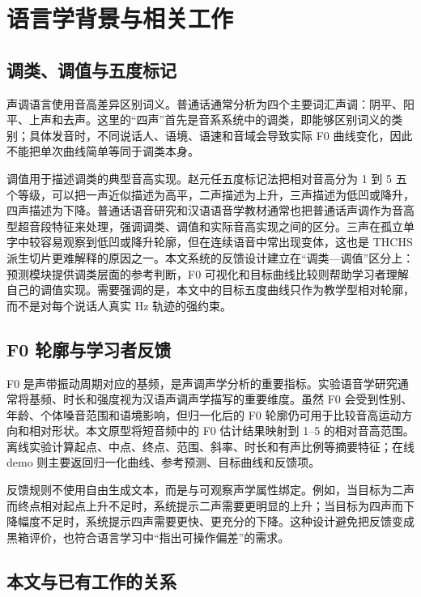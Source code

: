 \documentclass[UTF8,a4paper,twocolumn]{ctexart}
\begin{document}
\section{语言学背景与相关工作}

\subsection{调类、调值与五度标记}

声调语言使用音高差异区别词义。普通话通常分析为四个主要词汇声调：阴平、阳平、上声和去声。这里的“四声”首先是音系系统中的调类，即能够区别词义的类别；具体发音时，不同说话人、语境、语速和音域会导致实际 F0 曲线变化，因此不能把单次曲线简单等同于调类本身。

调值用于描述调类的典型音高实现。赵元任五度标记法把相对音高分为 1 到 5 五个等级，可以把一声近似描述为高平，二声描述为上升，三声描述为低凹或降升，四声描述为下降\cite{chao1930}。普通话语音研究和汉语语音学教材通常也把普通话声调作为音高型超音段特征来处理，强调调类、调值和实际音高实现之间的区分\cite{wu1992,zhu2010,huangliao2017,linwang2013}。三声在孤立单字中较容易观察到低凹或降升轮廓，但在连续语音中常出现变体，这也是 THCHS 派生切片更难解释的原因之一。本文系统的反馈设计建立在“调类—调值”区分上：预测模块提供调类层面的参考判断，F0 可视化和目标曲线比较则帮助学习者理解自己的调值实现。需要强调的是，本文中的目标五度曲线只作为教学型相对轮廓，而不是对每个说话人真实 Hz 轨迹的强约束。

\subsection{F0 轮廓与学习者反馈}

F0 是声带振动周期对应的基频，是声调声学分析的重要指标。实验语音学研究通常将基频、时长和强度视为汉语声调声学描写的重要维度\cite{shilin1986}。虽然 F0 会受到性别、年龄、个体嗓音范围和语境影响，但归一化后的 F0 轮廓仍可用于比较音高运动方向和相对形状。本文原型将短音频中的 F0 估计结果映射到 1--5 的相对音高范围。离线实验计算起点、中点、终点、范围、斜率、时长和有声比例等摘要特征；在线 demo 则主要返回归一化曲线、参考预测、目标曲线和反馈项。

反馈规则不使用自由生成文本，而是与可观察声学属性绑定。例如，当目标为二声而终点相对起点上升不足时，系统提示二声需要更明显的上升；当目标为四声而下降幅度不足时，系统提示四声需要更快、更充分的下降。这种设计避免把反馈变成黑箱评价，也符合语言学习中“指出可操作偏差”的需求。

\subsection{本文与已有工作的关系}
\end{document}
